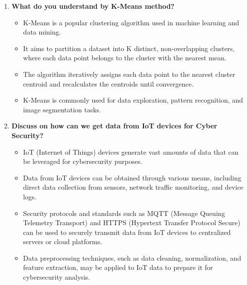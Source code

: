 \documentclass[11pt]{article}
\begin{document}
\begin{enumerate}
    \item \textbf{What do you understand by K-Means method?}
          \begin{itemize}
              \item K-Means is a popular clustering algorithm used in machine learning and data mining.
              \item It aims to partition a dataset into K distinct, non-overlapping clusters, where each data point belongs to the cluster with the nearest mean.
              \item The algorithm iteratively assigns each data point to the nearest cluster centroid and recalculates the centroids until convergence.
              \item K-Means is commonly used for data exploration, pattern recognition, and image segmentation tasks.
          \end{itemize}

    \item \textbf{Discuss on how can we get data from IoT devices for Cyber Security?}
          \begin{itemize}
              \item IoT (Internet of Things) devices generate vast amounts of data that can be leveraged for cybersecurity purposes.
              \item Data from IoT devices can be obtained through various means, including direct data collection from sensors, network traffic monitoring, and device logs.
              \item Security protocols and standards such as MQTT (Message Queuing Telemetry Transport) and HTTPS (Hypertext Transfer Protocol Secure) can be used to securely transmit data from IoT devices to centralized servers or cloud platforms.
              \item Data preprocessing techniques, such as data cleaning, normalization, and feature extraction, may be applied to IoT data to prepare it for cybersecurity analysis.
          \end{itemize}


\end{enumerate}
\end{document}
